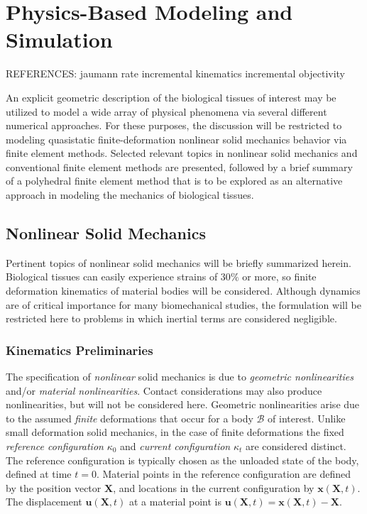 \chapter{Physics-Based Modeling and Simulation}
\label{chap:4}
%
REFERENCES:
\cite{rashid_2017}
\cite{rashid_201}
\cite{rashid_212, rashid_289, dafalias_205, suku_212}
jaumann rate \cite{rashid_1991}
incremental kinematics \cite{rashid_1993}
incremental objectivity \cite{rashid_1996}

An explicit geometric description of the biological tissues of interest may be utilized to model a wide array of physical phenomena via several different numerical approaches. For these purposes, the discussion will be restricted to modeling quasistatic finite-deformation nonlinear solid mechanics behavior via finite element methods. Selected relevant topics in nonlinear solid mechanics and conventional finite element methods are presented, followed by a brief summary of a polyhedral finite element method that is to be explored as an alternative approach in modeling the mechanics of biological tissues.

\section{Nonlinear Solid Mechanics}
\label{Nonlinear Solid Mechanics}

Pertinent topics of nonlinear solid mechanics will be briefly summarized herein. Biological tissues can easily experience strains of 30$\%$ or more, so finite deformation kinematics of material bodies will be considered. Although dynamics are of critical importance for many biomechanical studies, the formulation will be restricted here to problems in which inertial terms are considered negligible.

\subsection{Kinematics Preliminaries}

The specification of \textit{nonlinear} solid mechanics is due to \textit{geometric nonlinearities} and/or \textit{material nonlinearities}. Contact considerations may also produce nonlinearities, but will not be considered here. Geometric nonlinearities arise due to the assumed \textit{finite} deformations that occur for a body $\mathcal{B}$ of interest. Unlike small deformation solid mechanics, in the case of finite deformations the fixed \textit{reference configuration} $\kappa_0$ and \textit{current configuration} $\kappa_t$ are considered distinct. The reference configuration is typically chosen as the unloaded state of the body, defined at time $t=0$. Material points in the reference configuration are defined by the position vector $\bm{X}$, and locations in the current configuration by $\bm{x}(\bm{X},t)$. The displacement $\bm{u}(\bm{X},t)$ at a material point is $\bm{u}(\bm{X},t) = \bm{x}(\bm{X},t) - \bm{X}$.

